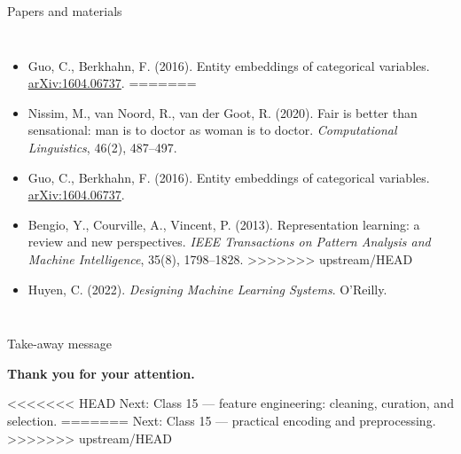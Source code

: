 \begin{frame}{Papers and materials}
{\begin{columns}[T]
\begin{itemize}
<<<<<<< HEAD
\item Guo, C., Berkhahn, F. (2016). Entity embeddings of categorical variables. \href{https://arxiv.org/abs/1604.06737}{arXiv:1604.06737}.
=======
\item Nissim, M., van Noord, R., van der Goot, R. (2020). Fair is better than sensational: man is to doctor as woman is to doctor. \emph{Computational Linguistics}, 46(2), 487--497.
\item Guo, C., Berkhahn, F. (2016). Entity embeddings of categorical variables. \href{https://arxiv.org/abs/1604.06737}{arXiv:1604.06737}.
\item Bengio, Y., Courville, A., Vincent, P. (2013). Representation learning: a review and new perspectives. \emph{IEEE Transactions on Pattern Analysis and Machine Intelligence}, 35(8), 1798--1828.
>>>>>>> upstream/HEAD
\item Huyen, C. (2022). \emph{Designing Machine Learning Systems}. O'Reilly.
\end{itemize}
\end{columns}
}
\coursefooter
\end{frame}

\begin{frame}{Take-away message}
\vfill
\centering
{}

\vfill
{\Large\bfseries\color{courseblue} Thank you for your attention.}

\vspace{0.4em}
<<<<<<< HEAD
{\small\color{coursegray} Next: Class 15 --- feature engineering: cleaning, curation, and selection.}
=======
{\small\color{coursegray} Next: Class 15 --- practical encoding and preprocessing.}
>>>>>>> upstream/HEAD
\vfill
\coursefooter
\end{frame}


